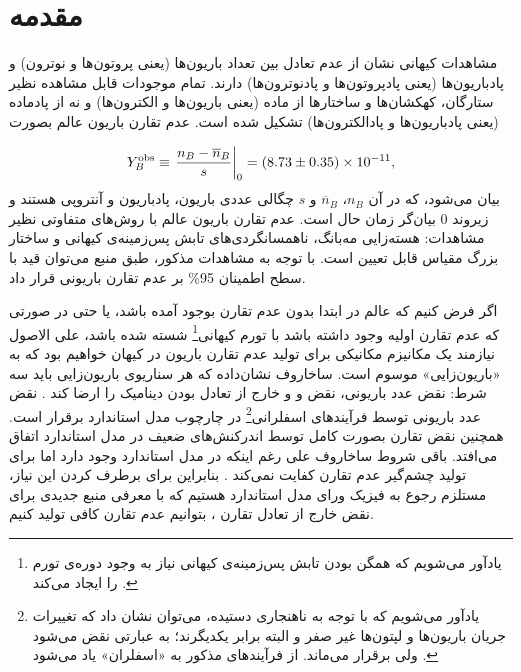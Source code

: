 \documentclass[a4paper]{book}
\begin{document}
\listoffigures

\chapter{مقدمه}
\label{chap:introduction}
مشاهدات کیهانی نشان از عدم تعادل بین تعداد باریون‌ها (یعنی پروتون‌ها و نوترون) و پادباریون‌ها (یعنی پادپروتون‌ها و پادنوترون‌ها) دارند. تمام موجودات قابل مشاهده نظیر ستارگان، کهکشان‌ها و ساختارها از ماده (یعنی باریون‌ها و الکترون‌ها) و نه از پادماده (یعنی پادباریون‌ها و پادالکترون‌ها) تشکیل شده است. عدم تقارن باریون عالم بصورت
\par
\vspace{-0.5cm}
{\footnotesize\begin{align}
	Y^{\rm obs}_{B} \equiv \left. \frac{n_B - \overline{n}_{B}}{s} \right|_0 = (8.73 \pm 0.35) \times 10^{-11},
\end{align}}
بیان می‌شود، که در آن {\footnotesize$n_B$}، {\footnotesize$\overline{n}_{B}$} و {\footnotesize$s$} چگالی عددی باریون، پادباریون و آنتروپی هستند و زیروند {\footnotesize$0$} بیان‌گر زمان حال است. عدم تقارن باریون عالم با روش‌های متفاوتی نظیر مشاهدات: هسته‌زایی مه‌بانگ، ناهمسانگردی‌های تابش پس‌زمینه‌ی کیهانی و ساختار بزرگ مقیاس قابل تعیین است. با توجه به مشاهدات مذکور، طبق منبع \cite{Simha:2008zj} می‌توان قید با سطح اطمینان 95\% بر عدم تقارن باریونی قرار داد.
	
اگر فرض کنیم که عالم در ابتدا بدون عدم تقارن بوجود آمده باشد، یا حتی در صورتی که عدم تقارن اولیه وجود داشته باشد با تورم کیهانی\footnote{یادآور می‌شویم که همگن بودن تابش پس‌زمینه‌ی کیهانی نیاز به وجود دوره‌ی تورم را ایجاد می‌کند \cite{Kolb:1990vq}.} شسته شده باشد، علی الاصول نیازمند یک مکانیزم مکانیکی برای تولید عدم تقارن باریون در کیهان خواهیم بود که به «باریون‌زایی» موسوم است. ساخاروف نشان‌داده که هر سناریوی باریون‌زایی باید سه شرط: نقض عدد باریونی، نقض  و  و خارج از تعادل بودن دینامیک را ارضا کند \cite{Sakharov:1967dj}. نقض عدد باریونی توسط فرآیندهای اسفلرانی\footnote{یادآور می‌شویم که با توجه به ناهنجاری دستیده، می‌توان نشان داد که تغییرات جریان باریون‌ها و لپتون‌ها غیر صفر و البته برابر یکدیگرند؛ به عبارتی  نقض می‌شود ولی  برقرار می‌ماند. از فرآیندهای مذکور به «اسفلران» یاد می‌شود \cite{Schwartz:2014sze}.} در چارچوب مدل استاندارد برقرار است. همچنین نقض تقارن  بصورت کامل توسط اندرکنش‌های ضعیف در مدل استاندارد اتفاق می‌افتد. باقی شروط ساخاروف علی رغم اینکه در مدل استاندارد وجود دارد اما برای تولید چشم‌گیر عدم تقارن کفایت نمی‌کند \cite{Gavela:1994ds,Gavela:1994dt}. بنابراین برای برطرف کردن این نیاز، مستلزم رجوع به فیزیک ورای مدل استاندارد هستیم که با معرفی منبع جدیدی برای نقض خارج از تعادل تقارن ، بتوانیم عدم تقارن کافی تولید کنیم.
\end{document}
